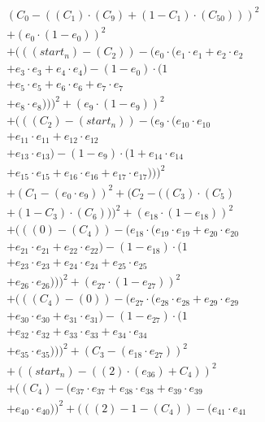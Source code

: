 \documentclass[10pt, a4paper]{article}
\begin{document}
\begin{align*}
& (C_{0} - ((C_{1})  \cdot  (C_{9}) + (1 - C_{1})  \cdot  (C_{50})))^{2} \\
& + (e_{0} \cdot (1 - e_{0}))^{2} \\
& + (((start_n) - (C_{2})) - (e_{0} \cdot (e_{1} \cdot e_{1} + e_{2} \cdot e_{2} \\
& + e_{3} \cdot e_{3} + e_{4} \cdot e_{4}) - (1 - e_{0}) \cdot (1 \\
& + e_{5} \cdot e_{5} + e_{6} \cdot e_{6} + e_{7} \cdot e_{7} \\
& + e_{8} \cdot e_{8})))^{2} + (e_{9} \cdot (1 - e_{9}))^{2} \\
& + (((C_{2}) - (start_n)) - (e_{9} \cdot (e_{10} \cdot e_{10} \\
& + e_{11} \cdot e_{11} + e_{12} \cdot e_{12} \\
& + e_{13} \cdot e_{13}) - (1 - e_{9}) \cdot (1 + e_{14} \cdot e_{14} \\
& + e_{15} \cdot e_{15} + e_{16} \cdot e_{16} + e_{17} \cdot e_{17})))^{2} \\
& + (C_{1} - (e_{0} \cdot e_{9}))^{2} + (C_{2} - ((C_{3})  \cdot  (C_{5}) \\
& + (1 - C_{3})  \cdot  (C_{6})))^{2} + (e_{18} \cdot (1 - e_{18}))^{2} \\
& + (((0) - (C_{4})) - (e_{18} \cdot (e_{19} \cdot e_{19} + e_{20} \cdot e_{20} \\
& + e_{21} \cdot e_{21} + e_{22} \cdot e_{22}) - (1 - e_{18}) \cdot (1 \\
& + e_{23} \cdot e_{23} + e_{24} \cdot e_{24} + e_{25} \cdot e_{25} \\
& + e_{26} \cdot e_{26})))^{2} + (e_{27} \cdot (1 - e_{27}))^{2} \\
& + (((C_{4}) - (0)) - (e_{27} \cdot (e_{28} \cdot e_{28} + e_{29} \cdot e_{29} \\
& + e_{30} \cdot e_{30} + e_{31} \cdot e_{31}) - (1 - e_{27}) \cdot (1 \\
& + e_{32} \cdot e_{32} + e_{33} \cdot e_{33} + e_{34} \cdot e_{34} \\
& + e_{35} \cdot e_{35})))^{2} + (C_{3} - (e_{18} \cdot e_{27}))^{2} \\
& + ((start_n) - ((2)  \cdot  (e_{36}) + C_{4}))^{2} \\
& + ((C_{4}) - (e_{37} \cdot e_{37} + e_{38} \cdot e_{38} + e_{39} \cdot e_{39} \\
& + e_{40} \cdot e_{40}))^{2} + (((2) - 1 - (C_{4})) - (e_{41} \cdot e_{41} \\

\end{align*}
\end{document}
